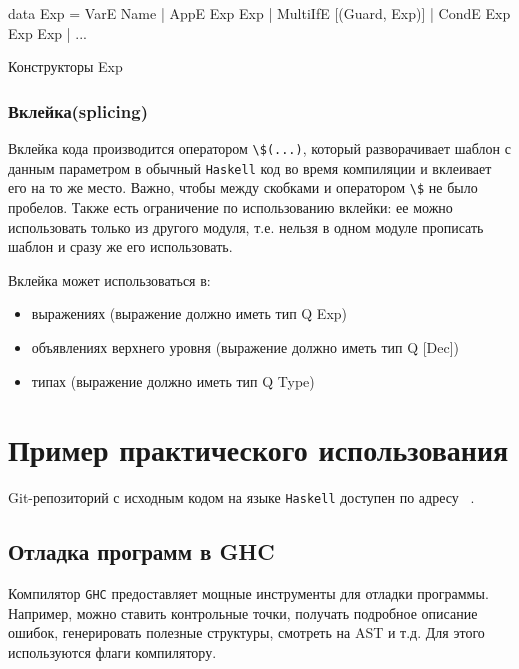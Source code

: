 \begin{ListingEnv}[H]
\begin{Verb}
data Exp
       = VarE Name
       | AppE Exp Exp
       | MultiIfE [(Guard, Exp)]
       | CondE Exp Exp Exp
       | ...
\end{Verb}
\caption{Конструкторы Exp}
\label{listing:expConstr}
\end{ListingEnv}

\subsection{Вклейка(splicing)}

Вклейка кода производится оператором  \lstinline{\$(...)}, который разворачивает шаблон с данным параметром в обычный \lstinline{Haskell} код во время компиляции и вклеивает его на то же место. Важно, чтобы между скобками и оператором \lstinline{\$} не было пробелов. Также есть ограничение по использованию вклейки: ее можно использовать только из другого модуля, т.е. нельзя в одном модуле прописать шаблон и сразу же его использовать.

Вклейка может использоваться в:

\begin{itemize}
  \item выражениях (выражение должно иметь тип Q Exp)
  \item объявлениях верхнего уровня (выражение должно иметь тип Q [Dec])
  \item типах (выражение должно иметь тип Q Type)
\end{itemize}

\chapter{Пример практического использования}

Git-репозиторий с исходным кодом на языке \lstinline{Haskell} доступен по адресу ~\cite{diploma}. 

\section{Отладка программ в GHC}

Компилятор \lstinline{GHC} предоставляет мощные инструменты для отладки программы. ~\cite{debugGHC} Например, можно ставить контрольные точки, получать подробное описание ошибок, генерировать полезные структуры, смотреть на AST и т.д. Для этого используются флаги компилятору. 

